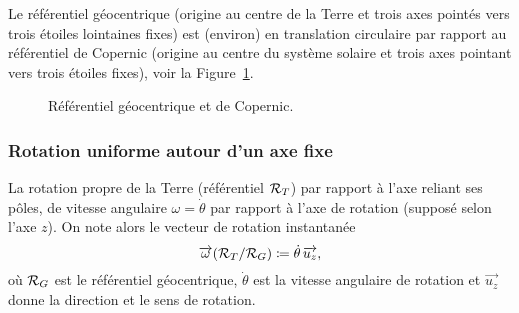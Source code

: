             \begin{example}
                Le référentiel géocentrique (origine au centre de la Terre et trois axes pointés vers trois étoiles lointaines \og fixes\fg) est (environ) en translation circulaire par rapport au référentiel de Copernic (origine au centre du système solaire et trois axes pointant vers trois étoiles \og fixes\fg), voir la Figure~\ref{fig:refentiel_geocentrique_copernic}.
                \begin{figure}[!h]
                    \centering
                    \caption{Référentiel géocentrique et de Copernic.}    
                    \label{fig:refentiel_geocentrique_copernic}
                \end{figure}
            \end{example}

        \subsubsection{Rotation uniforme autour d'un axe fixe}
            
            \begin{example}
                La rotation propre de la Terre (référentiel $\mathcal{R}_{T}$) par rapport à l'axe reliant ses pôles, de vitesse angulaire $\omega=\dot{\theta}$ par rapport à l'axe de rotation (supposé selon l'axe $z$). On note alors le vecteur de rotation instantanée
                \begin{equation*}
                    \protect\overrightarrow{{\omega}}(\mathcal{R}_{T}/\mathcal{R}_{G})\coloneqq \dot{\theta}\,\protect\overrightarrow{{u_z}},
                \end{equation*}
                où $\mathcal{R}_{G}$ est le référentiel géocentrique, $\dot{\theta}$ est la vitesse angulaire de rotation et $\vec{u_z}$ donne la direction et le sens de rotation.
            \end{example}

